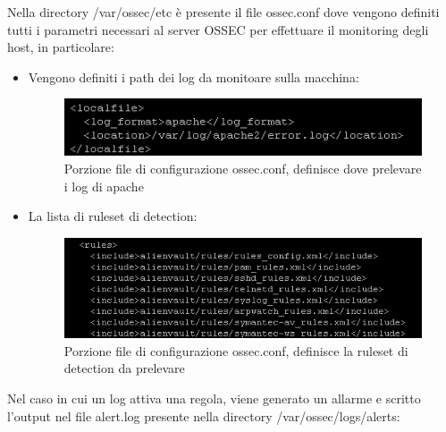 \newpage

Nella directory /var/ossec/etc è presente il file ossec.conf dove vengono definiti tutti i parametri necessari al server OSSEC per effettuare il monitoring degli host, in particolare:

\begin{itemize}
    \item Vengono definiti i path dei log da monitoare sulla macchina:
            \begin{figure}[h]
            \begin{center}
                \includegraphics[width=0.80\columnwidth]{images/4_caso_d'uso_img/ossecAgent.png}
            \end{center}
            \caption{Porzione file di configurazione ossec.conf, definisce dove prelevare i log di apache}
            \label{fig:Porzione file di configurazione ossec.conf, definisce dove prelevare i log di apache}
             \end{figure}
    \item La lista di ruleset di detection:
            \begin{figure}[h]
            \begin{center}
                \includegraphics[width=0.80\columnwidth]{images/4_caso_d'uso_img/ossecRuleset.png}
            \end{center}
            \caption{Porzione file di configurazione ossec.conf, definisce la ruleset di detection da prelevare}
            \label{fig:Porzione file di configurazione ossec.conf, definisce la ruleset  di detection da prelevare}
             \end{figure}
\end{itemize}

\newpage

Nel caso in cui un log attiva una regola, viene generato un allarme e scritto l’output nel file alert.log presente nella directory /var/ossec/logs/alerts:

